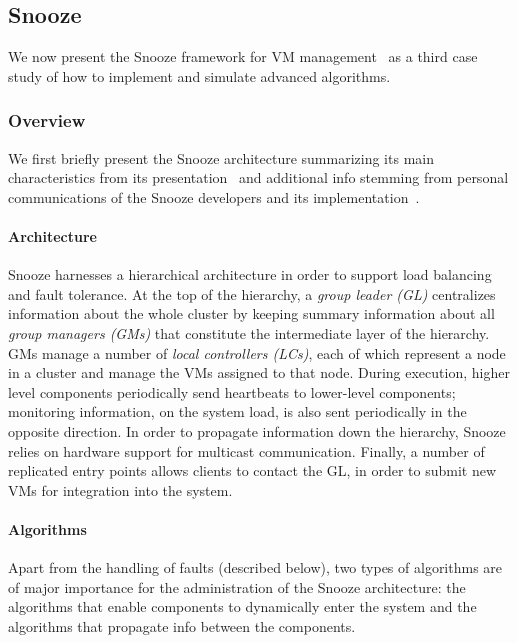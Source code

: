 \subsection{Snooze}
\label{subsec:snooze}


We now present the Snooze framework for VM
management~\cite{feller:ccgrid12} as a third case study of how
to implement and simulate advanced algorithms.

\subsubsection{Overview}

We first briefly present the Snooze architecture summarizing its main
characteristics from its presentation~\cite{feller:ccgrid12} and
additional info stemming from personal communications of the Snooze
developers and its implementation~\cite{snoozedev14,snoozeweb}.

\paragraph{Architecture}

Snooze harnesses a hierarchical architecture in order to support load
balancing and fault tolerance. At the top of the hierarchy, a
\emph{group leader (GL)} centralizes information about the whole
cluster by keeping summary information about all \emph{group managers
  (GMs)} that constitute the intermediate layer of the hierarchy. GMs
manage a number of \emph{local controllers (LCs)}, each of which
represent a node in a cluster and manage the VMs assigned to that
node. During execution, higher level components periodically send
heartbeats to lower-level components; monitoring information, \eg on
the system load, is also sent periodically in the opposite
direction. In order to propagate information down the hierarchy,
Snooze relies on hardware support for multicast
communication. Finally, a number of replicated entry points allows
clients to contact the GL, \eg in order to submit new VMs for
integration into the system.

\paragraph{Algorithms}

Apart from the handling of faults (described below), two types of
algorithms are of major importance for the administration of the
Snooze architecture: the algorithms that enable components to
dynamically enter the system and the algorithms that propagate info
between the components.

